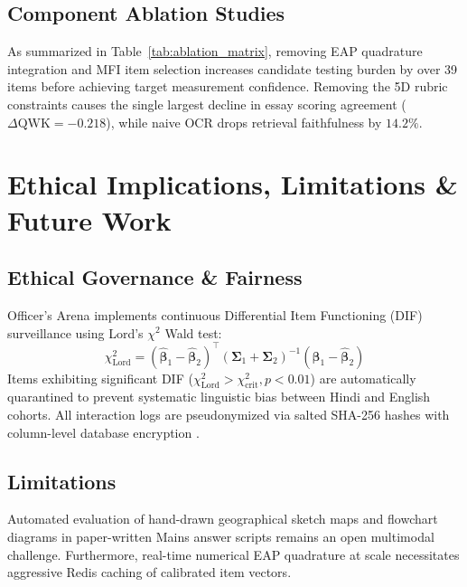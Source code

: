 \documentclass[conference]{IEEEtran}
\begin{document}
\subsection{Component Ablation Studies}
As summarized in Table~\ref{tab:ablation_matrix}, removing EAP quadrature integration and MFI item selection increases candidate testing burden by over 39 items before achieving target measurement confidence. Removing the 5D rubric constraints causes the single largest decline in essay scoring agreement ($\Delta \text{QWK} = -0.218$), while naive OCR drops retrieval faithfulness by $14.2\%$.

\section{Ethical Implications, Limitations \& Future Work}

\subsection{Ethical Governance \& Fairness}
Officer's Arena implements continuous Differential Item Functioning (DIF) surveillance using Lord's $\chi^2$ Wald test:
\begin{equation}
    \chi_{\text{Lord}}^2 = (\hat{\boldsymbol{\beta}}_1 - \hat{\boldsymbol{\beta}}_2)^\top \left( \boldsymbol{\Sigma}_1 + \boldsymbol{\Sigma}_2 \right)^{-1} (\hat{\boldsymbol{\beta}}_1 - \hat{\boldsymbol{\beta}}_2)
    \label{eq:lords_chi2}
\end{equation}
Items exhibiting significant DIF ($\chi_{\text{Lord}}^2 > \chi_{\text{crit}}^2, p < 0.01$) are automatically quarantined to prevent systematic linguistic bias between Hindi and English cohorts. All interaction logs are pseudonymized via salted SHA-256 hashes with column-level database encryption \cite{Yan2024,Albadarin2024}.

\subsection{Limitations}
Automated evaluation of hand-drawn geographical sketch maps and flowchart diagrams in paper-written Mains answer scripts remains an open multimodal challenge. Furthermore, real-time numerical EAP quadrature at scale necessitates aggressive Redis caching of calibrated item vectors.
\end{document}
